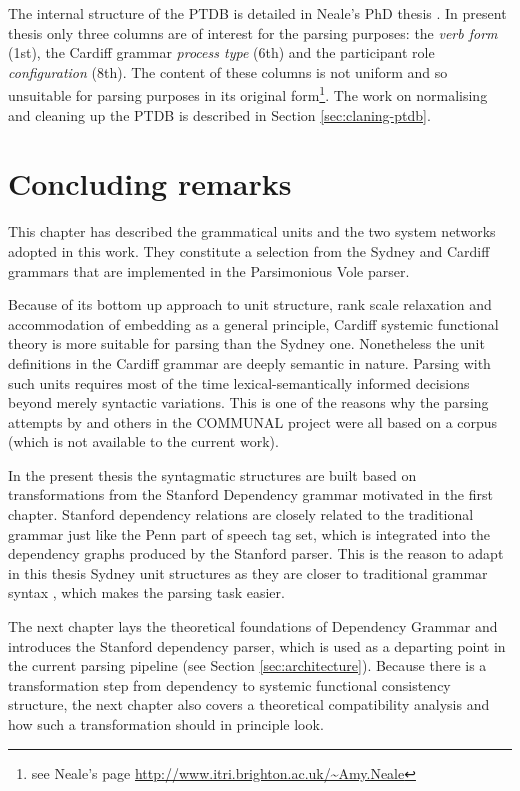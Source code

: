     The internal structure of the PTDB is detailed in Neale's PhD thesis \citep[193--231]{Neale2002}. In present thesis only three columns are of interest for the parsing purposes: the \textit{verb form} (1st), the Cardiff grammar \textit{process type} (6th) and the participant role \textit{configuration} (8th). The content of these columns is not uniform and so unsuitable for parsing purposes in its original form\footnote{see Neale's page  \url{http://www.itri.brighton.ac.uk/~Amy.Neale}}. The work on normalising and cleaning up the PTDB is described in Section \ref{sec:claning-ptdb}.


\section{Concluding remarks}
    This chapter has described the grammatical units and the two system networks adopted in this work. They constitute a selection from the Sydney and Cardiff grammars that are implemented in the Parsimonious Vole parser.
    
    Because of its bottom up approach to unit structure, rank scale relaxation and accommodation of embedding as a general principle, Cardiff systemic functional theory is more suitable for parsing than the Sydney one. Nonetheless the unit definitions in the Cardiff grammar are deeply semantic in nature. Parsing with such units requires most of the time lexical-semantically informed decisions beyond merely syntactic variations. This is one of the reasons why the parsing attempts by \citet{ODonoghue1991a} and others in the COMMUNAL project were all based on a corpus (which is not available to the current work). 
    
    In the present thesis the syntagmatic structures are built based on transformations from the Stanford Dependency grammar motivated in the first chapter. Stanford dependency relations are closely related to the traditional grammar just like the Penn part of speech tag set, which is integrated into the dependency graphs produced by the Stanford parser. This is the reason to adapt in this thesis Sydney unit structures as they are closer to traditional grammar syntax \citep{Quirk1985}, which makes the parsing task easier.
    
    The next chapter lays the theoretical foundations of Dependency Grammar and introduces the Stanford dependency parser, which is used as a departing point in the current parsing pipeline (see Section \ref{sec:architecture}). Because there is a transformation step from dependency to systemic functional consistency structure, the next chapter also covers a theoretical compatibility analysis and how such a transformation should in principle look. 

